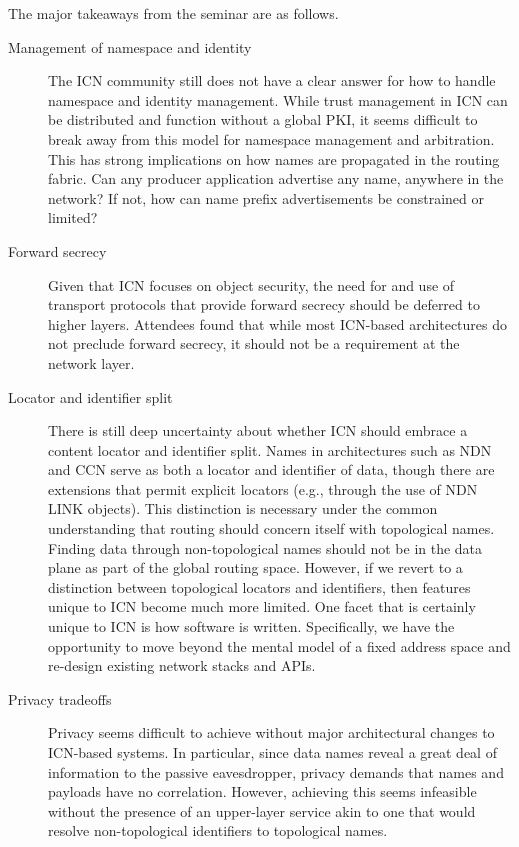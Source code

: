 \documentclass{sig-alternate-10pt}
\makeatletter
\renewcommand{\paragraph}[1]{\vspace*{0.03in}\noindent{\bf #1.}\hspace{0.25ex \@plus1ex \@minus.2ex}}
\makeatother
\begin{document}
\paragraph{Main Takeways} The major takeaways from the seminar are as follows.

\begin{description}
  \item[Management of namespace and identity] The ICN community still does not have a clear answer for how to handle
namespace and identity management. While trust management in ICN can be distributed and
function without a global PKI, it seems difficult to break away from this model for
namespace management and arbitration. This has strong implications on how names are
propagated in the routing fabric. Can any producer application advertise any name,
anywhere in the network? If not, how can name prefix advertisements be constrained or limited?

  \item[Forward secrecy] Given that ICN focuses on object security, the need for and use of transport
protocols that provide forward secrecy should be deferred to higher layers. Attendees
found that while most ICN-based architectures do not preclude forward secrecy, it should
not be a requirement at the network layer.

  \item[Locator and identifier split] There is still deep uncertainty about whether ICN should embrace a content
locator and identifier split. Names in architectures such as NDN and CCN serve as both a
locator and identifier of data, though there are extensions that permit explicit locators
(e.g., through the use of NDN LINK objects). This distinction is necessary under the
common understanding that routing should concern itself with topological names. Finding
data through non-topological names should not be in the data plane as part of the global
routing space. However, if we revert to a distinction between topological locators and
identifiers, then features unique to ICN become much more limited. One facet that is
certainly unique to ICN is how software is written. Specifically, we have the opportunity
to move beyond the mental model of a fixed address space and re-design existing network
stacks and APIs.

  \item[Privacy tradeoffs] Privacy seems difficult to achieve without major architectural changes to
ICN-based systems. In particular, since data names reveal a great deal of information to
the passive eavesdropper, privacy demands that names and payloads have no correlation.
However, achieving this seems infeasible without the presence of an upper-layer service
akin to one that would resolve non-topological identifiers to topological names.


\end{description}
\end{document}
